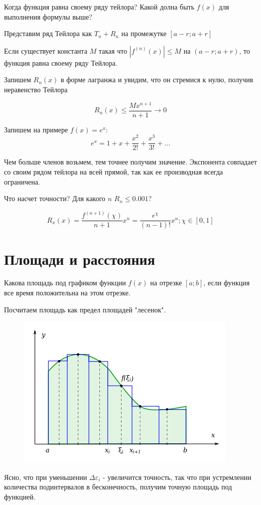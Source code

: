 \documentclass{article}
\begin{document}
Когда функция равна своему ряду тейлора? Какой долна быть $f(x)$ для выполнения формулы выше?

Представим ряд Тейлора как $T_n+R_n$ на промежутке $[a-r;a+r]$

Если существует константа $M$ такая что $|f^{(n)}(x)| \le M$ на $(a-r;a+r)$, то функция равна своему ряду Тейлора.

Запишем $R_n(x)$ в форме лагранжа и увидим, что он стремися к нулю, получив неравенство Тейлора

$$R_n(x) \le \frac{M x^{n+1}}{n+1} \to 0$$


Запишем на примере $f(x) = e^x$:
$$e^x = 1 + x + \frac{x^2}{2!} + \frac{x^3}{3!} + \ldots$$

Чем больше членов возьмем, тем точнее получим значение. Экспонента совпадает со своим рядом тейлора на всей прямой, так как ее производная всегда ограничена.

Что насчет точности? Для какого $n$ $R_n \le 0.001$? 

$$R_x(x) = \frac{f^{(n+1)}(\chi)}{n+1}x^n = \frac{e^{\chi}}{(n-1)!}x^n; \chi \in [0,1]$$

\section*{Площади и расстояния}
Какова площадь под графиком функции $f(x)$ на отрезке $[a;b]$, если функция все время положительна на этом отрезке.

Посчитаем площадь как предел площадей "лесенок".

\begin{figure}[htp]
\centering
\includegraphics[scale=1.00]{int-stair.png}
\end{figure}

Ясно, что при уменьшении $\Delta \varepsilon_i$ - увеличится точность, так что при устремлении количества подинтервалов в бесконечность, получим точную площадь под функцией.
\end{document}
